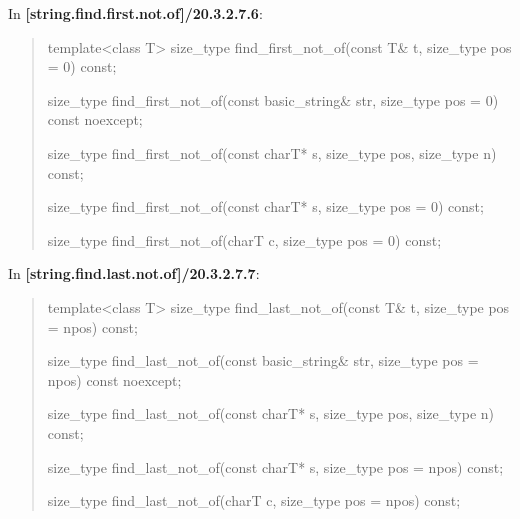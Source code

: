 \documentclass{wg21}
\begin{document}
In \textbf{[string.find.first.not.of]/20.3.2.7.6}:
\begin{quote}
\begin{itemdecl}
template<class T>
  size_type find_first_not_of(const T& t, size_type pos = 0) const;
\end{itemdecl}

\begin{itemdecl}
size_type find_first_not_of(const basic_string& str, size_type pos = 0) const noexcept;
\end{itemdecl}

\begin{itemdecl}
size_type find_first_not_of(const charT* s, size_type pos, size_type n) const;
\end{itemdecl}

\begin{itemdecl}
size_type find_first_not_of(const charT* s, size_type pos = 0) const;
\end{itemdecl}

\begin{itemdecl}
size_type find_first_not_of(charT c, size_type pos = 0) const;
\end{itemdecl}
\end{quote}

In \textbf{[string.find.last.not.of]/20.3.2.7.7}:
\begin{quote}
\begin{itemdecl}
template<class T>
  size_type find_last_not_of(const T& t, size_type pos = npos) const;
\end{itemdecl}

\begin{itemdecl}
size_type find_last_not_of(const basic_string& str, size_type pos = npos) const noexcept;
\end{itemdecl}

\begin{itemdecl}
size_type find_last_not_of(const charT* s, size_type pos, size_type n) const;
\end{itemdecl}

\begin{itemdecl}
size_type find_last_not_of(const charT* s, size_type pos = npos) const;
\end{itemdecl}

\begin{itemdecl}
size_type find_last_not_of(charT c, size_type pos = npos) const;
\end{itemdecl}
\end{quote}
\end{document}
